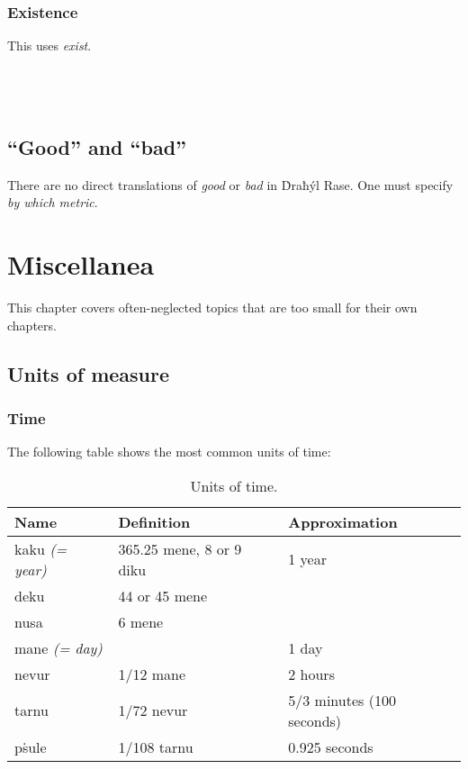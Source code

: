 \documentclass{book}
\begin{document}
\subsection{Existence}

This uses  \emph{exist}. \\
~\\
  \\
  \\
\emph{ }

\section{``Good'' and ``bad''}

There are no direct translations of \emph{good} or \emph{bad} in Ḋraħýl Rase. One must specify \emph{by which metric}.

\chapter{Miscellanea}

This chapter covers often-neglected topics that are too small for their own chapters.

\section{Units of measure}

\subsection{Time}

The following table shows the most common units of time:

\begin{table}[h]
    \caption{Units of time.}
    \centering
    \begin{tabu}{|l|X|X|}
        \hline
        Name & Definition & Approximation \\
        \hline
        kaku \emph{(= year)} & 365.25 mene, 8 or 9 diku & 1 year \\
        deku & 44 or 45 mene & \\
        nusa & 6 mene & \\
        mane \emph{(= day)} & & 1 day \\
        nevur & 1/12 mane & 2 hours \\
        tarnu & 1/72 nevur & 5/3 minutes (100 seconds) \\
        pṡule & 1/108 tarnu & 0.925 seconds \\
        \hline
    \end{tabu}
\end{table}
\end{document}
